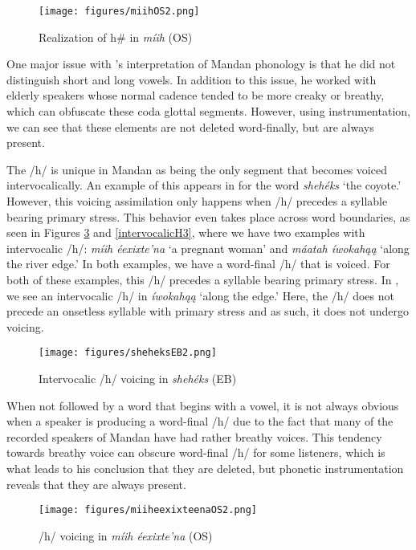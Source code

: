 \begin{figure}

\caption{Realization of h{\#} in \textit{míih} (OS)}\label{finalH}
\texttt{[image: figures/miihOS2.png]}
\end{figure}

One major issue with \citeauthor{hollow1970}'s interpretation of Mandan phonology is that he did not distinguish short and long vowels. In addition to this issue, he worked with elderly speakers whose normal cadence tended to be more creaky or breathy, which can obfuscate these coda glottal segments. However, using instrumentation, we can see that these elements are not deleted word-finally, but are always present.

The /h/ is unique in Mandan as being the only segment that becomes voiced intervocalically. An example of this appears in  for the word \textit{shehéks} `the coyote.' However, this voicing assimilation only happens when /h/ precedes a syllable bearing primary stress. This behavior even takes place across word boundaries, as seen in Figures \ref{intervocalicH2} and \ref{intervocalicH3}, where we have two examples with intervocalic /h/: \textit{míih éexixte'na} `a pregnant woman' and \textit{máatah íwokahąą} `along the river edge.' In both examples, we have a word-final /h/ that is voiced. For both of these examples, this /h/ precedes a syllable bearing primary stress. In , we see an intervocalic /h/ in \textit{íwokahąą} `along the edge.' Here, the /h/ does not precede an onsetless syllable with primary stress and as such, it does not undergo voicing.



\begin{figure}
\caption{Intervocalic /h/ voicing in \textit{shehéks} (EB)}\label{intervocalicH1}
\texttt{[image: figures/sheheksEB2.png]}

\end{figure}


When not followed by a word that begins with a vowel, it is not always obvious when a speaker is producing a word-final /h/ due to the fact that many of the recorded speakers of Mandan have had rather breathy voices. This tendency towards breathy voice can obscure word-final /h/ for some listeners, which is what leads \citet[43]{hollow1970} to his conclusion that they are deleted, but phonetic instrumentation reveals that they are always present.


\begin{figure}

\caption{/h/ voicing in \textit{míih éexixte'na} (OS)}\label{intervocalicH2}
\texttt{[image: figures/miiheexixteenaOS2.png]}
\end{figure}


